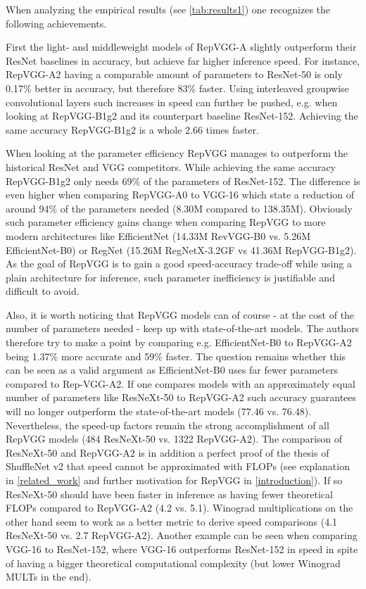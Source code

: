 When analyzing the empirical results (see \autoref{tab:results1}) one recognizes the following achievements. 

First the light- and middleweight models of RepVGG-A slightly outperform their ResNet \cite{KaimingHe.2015} baselines in accuracy, but achieve far higher inference speed. For instance, RepVGG-A2 having a comparable amount of parameters to ResNet-50 is only 0.17\% better in accuracy, but therefore 83\% faster. Using interleaved groupwise convolutional layers such increases in speed can further be pushed, e.g. when looking at RepVGG-B1g2 and its counterpart baseline ResNet-152. Achieving the same accuracy RepVGG-B1g2 is a whole 2.66 times faster. 

When looking at the parameter efficiency RepVGG manages to outperform the historical ResNet \cite{KaimingHe.2015} and VGG \cite{KarenSimonyan.2014} competitors. While achieving the same accuracy RepVGG-B1g2 only needs 69\% of the parameters of ResNet-152. The difference is even higher when comparing RepVGG-A0 to VGG-16 which state a reduction of around 94\% of the parameters needed (8.30M compared to 138.35M). Obviously such parameter efficiency gains change when comparing RepVGG to more modern architectures like EfficientNet \cite{LeMingxingTan.2019} (14.33M RevVGG-B0 vs. 5.26M EfficientNet-B0) or RegNet \cite{IlijaRadosavovic.2020} (15.26M RegNetX-3.2GF vs 41.36M RepVGG-B1g2). As the goal of RepVGG is to gain a good speed-accuracy trade-off while using a plain architecture for inference, such parameter inefficiency is justifiable and difficult to avoid. 

Also, it is worth noticing that RepVGG models can of course - at the cost of the number of parameters needed - keep up with state-of-the-art models. The authors therefore try to make a point by comparing e.g. EfficientNet-B0 to RepVGG-A2 being 1.37\% more accurate and 59\% faster. The question remains whether this can be seen as a valid argument as EfficientNet-B0 uses far fewer parameters compared to Rep-VGG-A2. If one compares models with an approximately equal number of parameters like ResNeXt-50 to RepVGG-A2 such accuracy guarantees will no longer outperform the state-of-the-art models (77.46 vs. 76.48). Nevertheless, the speed-up factors remain the strong accomplishment of all RepVGG models (484 ResNeXt-50 vs. 1322 RepVGG-A2). The comparison of ResNeXt-50 and RepVGG-A2 is in addition a perfect proof of the thesis of ShuffleNet v2 \cite{NingningMa.2018} that speed cannot be approximated with FLOPs (see explanation in \autoref{related_work} and further motivation for RepVGG in \autoref{introduction}). If so ResNeXt-50 should have been faster in inference as having fewer theoretical FLOPs compared to RepVGG-A2 (4.2 vs. 5.1). Winograd multiplications \cite{AndrewLavin.2015} on the other hand seem to work as a better metric to derive speed comparisons (4.1 ResNeXt-50 vs. 2.7 RepVGG-A2). Another example can be seen when comparing VGG-16 to ResNet-152, where VGG-16 outperforms ResNet-152 in speed in spite of having a bigger theoretical computational complexity (but lower Winograd MULTs in the end).

